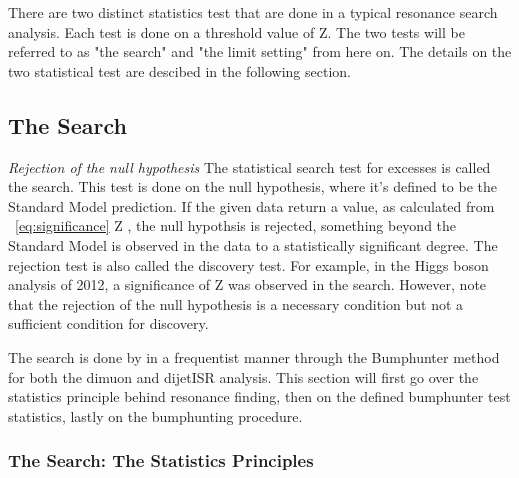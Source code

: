 There are two distinct statistics test that are done in a typical resonance search analysis. Each test is done on a threshold value of Z. The two tests will be referred to as "the search" and "the limit setting" from here on. The details on the two statistical test are descibed in the following section.





\subsection{The Search}


\textit{Rejection of the null hypothesis}
The statistical search test for excesses is called the search. This test is done on the null hypothesis, where it's defined to be the Standard Model prediction. If the given data return a value, as calculated from ~\ref{eq:significance} Z , the null hypothsis is rejected, something beyond the Standard Model is observed in the data to a statistically significant degree. The rejection test is also called the discovery test. For example, in the Higgs boson analysis of 2012, a significance of Z was observed in the search. However, note that the rejection of the null hypothesis is a necessary condition but not a sufficient condition for discovery.

The search is done by in a frequentist manner through the Bumphunter method~\cite{choudalakis2011hypothesis} for both the dimuon and dijetISR analysis. This section will first go over the statistics principle behind resonance finding, then on the defined bumphunter test statistics, lastly on the bumphunting procedure. 





\subsubsection{The Search: The Statistics Principles}


